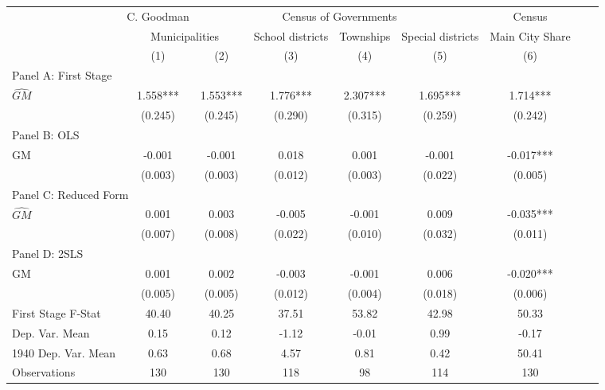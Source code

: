  \begin{tabular}{l*{8}{c}} \toprule
&\multicolumn{1}{c}{C. Goodman}&\multicolumn{4}{c}{Census of Governments}&\multicolumn{1}{c}{Census}\\\cmidrule(lr){2-2}\cmidrule(lr){3-6}\cmidrule(lr){7-7}
&\multicolumn{2}{c}{Municipalities}&\multicolumn{1}{c}{School districts}&\multicolumn{1}{c}{Townships}&\multicolumn{1}{c}{Special districts}&\multicolumn{1}{c}{Main City Share}\\\cmidrule(lr){2-3}\cmidrule(lr){4-6}\cmidrule(lr){7-7}
&\multicolumn{1}{c}{(1)}&\multicolumn{1}{c}{(2)}&\multicolumn{1}{c}{(3)}&\multicolumn{1}{c}{(4)}&\multicolumn{1}{c}{(5)}&\multicolumn{1}{c}{(6)}\\
\cmidrule(lr){1-7}
\multicolumn{6}{l}{Panel A: First Stage}\\
\cmidrule(lr){1-7}
$\widehat{GM}$  &    1.558***&    1.553***&    1.776***&    2.307***&    1.695***&    1.714***\\
                &  (0.245)   &  (0.245)   &  (0.290)   &  (0.315)   &  (0.259)   &  (0.242)   \\
\cmidrule(lr){1-7}
\multicolumn{6}{l}{Panel B: OLS}\\
\cmidrule(lr){1-7}
GM              &   -0.001   &   -0.001   &    0.018   &    0.001   &   -0.001   &   -0.017***\\
                &  (0.003)   &  (0.003)   &  (0.012)   &  (0.003)   &  (0.022)   &  (0.005)   \\
\cmidrule(lr){1-7}
\multicolumn{6}{l}{Panel C: Reduced Form}\\
\cmidrule(lr){1-7}
$\widehat{GM}$  &    0.001   &    0.003   &   -0.005   &   -0.001   &    0.009   &   -0.035***\\
                &  (0.007)   &  (0.008)   &  (0.022)   &  (0.010)   &  (0.032)   &  (0.011)   \\
\cmidrule(lr){1-7}
\multicolumn{6}{l}{Panel D: 2SLS}\\
\cmidrule(lr){1-7}
GM              &    0.001   &    0.002   &   -0.003   &   -0.001   &    0.006   &   -0.020***\\
                &  (0.005)   &  (0.005)   &  (0.012)   &  (0.004)   &  (0.018)   &  (0.006)   \\
\midrule
First Stage F-Stat&    40.40   &    40.25   &    37.51   &    53.82   &    42.98   &    50.33   \\
Dep. Var. Mean  &     0.15   &     0.12   &    -1.12   &    -0.01   &     0.99   &    -0.17   \\
1940 Dep. Var. Mean&     0.63   &     0.68   &     4.57   &     0.81   &     0.42   &    50.41   \\
Observations    &      130   &      130   &      118   &       98   &      114   &      130   \\
       \bottomrule \end{tabular}
